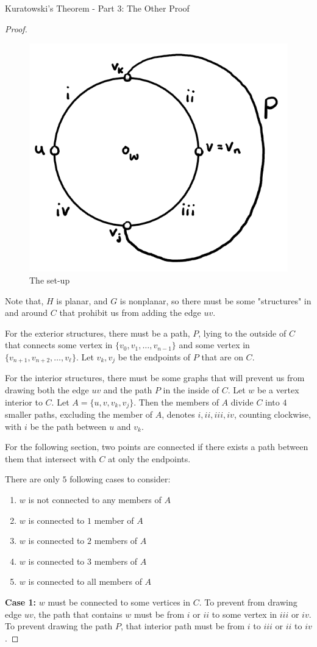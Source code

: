 \documentclass[12pt]{article}
\theoremstyle{definition}
\begin{document}
\begin{section}{Kuratowski's Theorem - Part 3: The Other Proof}
\begin{proof}
\begin{figure}
    \centering
    \includegraphics[width=0.4\linewidth]{graphs/set_up.png}
    \caption{The set-up}
\end{figure}

Note that, $H$ is planar, and $G$ is nonplanar, so there must be some "structures" in and around $C$ that prohibit us from adding the edge $uv$.

For the exterior structures, there must be a path, $P$, lying to the outside of $C$ that connects some vertex in $\{v_0, v_1, \dots, v_{n-1} \}$ and some vertex in $\{ v_{n+1}, v_{n+2}, \dots, v_{\ell} \}$. Let $v_k, v_j$ be the endpoints of $P$ that are on $C$.

For the interior structures, there must be some graphs that will prevent us from drawing both the edge $uv$ and the path $P$ in the inside of $C$. Let $w$ be a vertex interior to $C$. Let $A = \{ u, v, v_k, v_j \}$. Then the members of $A$ divide $C$ into $4$ smaller paths, excluding the member of $A$, denotes $i, ii, iii, iv$, counting clockwise, with $i$ be the path between $u$ and $v_k$.

For the following section, two points are connected if there exists a path between them that intersect with $C$ at only the endpoints.

There are only $5$ following cases to consider:
\begin{enumerate}
  \item $w$ is not connected to any members of $A$
  \item $w$ is connected to $1$ member of $A$
  \item $w$ is connected to $2$ members of $A$
  \item $w$ is connected to $3$ members of $A$
  \item $w$ is connected to all members of $A$
\end{enumerate}

\textbf{Case 1:} $w$ must be connected to some vertices in $C$. To prevent from drawing edge $uv$, the path that contains $w$ must be from $i$ or $ii$ to some vertex in $iii$ or $iv$. To prevent drawing the path $P$, that interior path must be from $i$ to $iii$ or $ii$ to $iv$.


\end{proof}
\end{section}
\end{document}
